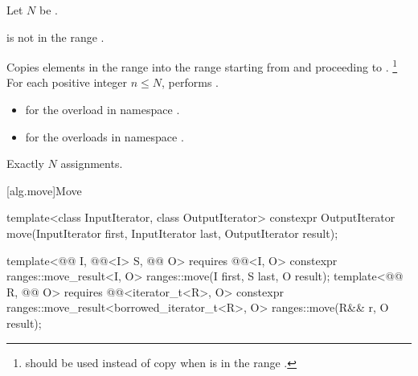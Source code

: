 \begin{itemdescr}
\pnum
Let $N$ be .

\pnum
\expects
{} is not in the range .

\pnum
\effects
Copies elements in the range 
into the range 
starting from  and proceeding to .%
\footnote{ should be used instead of copy
when  is in the range .}
For each positive integer $n \le N$,
performs .

\pnum
\returns
\begin{itemize}
\item
  for the overload in namespace .
\item
  for the overloads in namespace .
\end{itemize}

\pnum
\complexity
Exactly $N$ assignments.
\end{itemdescr}

[alg.move]{Move}

%
\begin{itemdecl}
template<class InputIterator, class OutputIterator>
  constexpr OutputIterator move(InputIterator first, InputIterator last,
                                OutputIterator result);

template<@@ I, @@<I> S, @@ O>
  requires @@<I, O>
  constexpr ranges::move_result<I, O>
    ranges::move(I first, S last, O result);
template<@@ R, @@ O>
  requires @@<iterator_t<R>, O>
  constexpr ranges::move_result<borrowed_iterator_t<R>, O>
    ranges::move(R&& r, O result);
\end{itemdecl}

